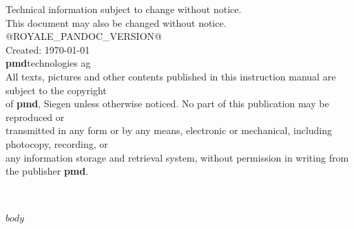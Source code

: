 \documentclass[11pt,oneside]{article}
\begin{document}
\vspace*{\fill}
\small{
Technical information subject to change without notice.\\
This document may also be changed without notice.\\
@ROYALE_PANDOC_VERSION@ \\
Created:  \indent \today\\
\textcopyright \textbf{pmd}technologies ag\\
All texts, pictures and other contents published in this instruction manual are subject to the copyright\\
of \textbf{pmd}, Siegen unless otherwise noticed. No part of this publication may be reproduced or\\
transmitted in any form or by any means, electronic or mechanical, including photocopy, recording, or\\
any information storage and retrieval system, without permission in writing from the publisher \textbf{pmd}.}\\\\\\

\cleardoublepage

\setcounter{page}{3}
\tableofcontents

\cleardoublepage

$body$

\cleardoublepage
\printindex
\end{document}
